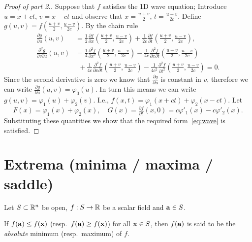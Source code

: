 \begin{proof}[Proof of part 2.]
    Suppose that \(f\) satisfies the 1D wave equation;
    Introduce \(u = x + ct\), \(v=x-ct\)
    and observe that \(x = \frac{u+v}{2}\), \(t=\frac{u-v}{2c}\).
    Define \(g(u,v) = f(   \frac{u+v}{2} , \frac{u-v}{2c} )\).
    By the chain rule
    \[
        \begin{aligned}
            \tfrac{\partial g}{\partial u}(u,v)
             & = \tfrac{1}{2} \tfrac{\partial f}{\partial x}(   \tfrac{u+v}{2} , \tfrac{u-v}{2c} )
            + \tfrac{1}{2c} \tfrac{\partial f}{\partial t}(   \tfrac{u+v}{2} , \tfrac{u-v}{2c} ),                     \\
            \tfrac{\partial^2 g}{\partial v \partial u}(u,v)
             & = \tfrac{1}{4} \tfrac{\partial^2 f}{\partial x^2}(   \tfrac{u+v}{2} , \tfrac{u-v}{2c} )
            - \tfrac{1}{4c} \tfrac{\partial^2 f}{\partial x\partial t}(   \tfrac{u+v}{2} , \tfrac{u-v}{2c} )          \\
             & \ \ +  \tfrac{1}{4c} \tfrac{\partial^2 f}{\partial x \partial t}(   \tfrac{u+v}{2} , \tfrac{u-v}{2c} )
            -  \tfrac{1}{4c^2} \tfrac{\partial^2 f}{\partial t^2}(   \tfrac{u+v}{2} , \tfrac{u-v}{2c} ) = 0.
        \end{aligned}
    \]
    Since the second derivative is zero we know that \(\tfrac{\partial g}{\partial u}\) is constant in \(v\), therefore we can write \( \tfrac{\partial g}{\partial u}(u,v) = \varphi_0(u)\).
    In turn this means we can write \(g(u,v) = \varphi_1(u) + \varphi_2(v)\).
    I.e., \(f(x,t) = \varphi_1(x+ct) + \varphi_2(x-ct)\).
    Let
    \[
        F(x) = \varphi_1(x) + \varphi_2(x), \quad
        G(x) = \tfrac{\partial f}{\partial t}(x,0) = c\varphi'_1(x) - c\varphi'_2(x).
    \]
    Substituting these quantities we show that the required form~\eqref{eq:wave} is satisfied.
\qedhere
\end{proof}

\section{Extrema (minima / maxima / saddle)}

Let \(S\subset \bR^n\) be open,
\(f:S \to \bR\) be a scalar field
and \(\aa \in S\).

\begin{definition}
    If \(f(\aa)\leq f(\xx)\) (resp.\ \(f(\aa)\geq f(\xx)\)) for all \(\xx \in S\), then \(f(\aa)\) is said to be the \emph{absolute} minimum (resp.\ maximum) of \(f\).
\end{definition}

